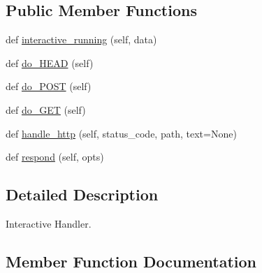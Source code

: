 \subsection*{Public Member Functions}
\begin{DoxyCompactItemize}
\item 
def \hyperlink{classprojects_1_1personality__captions_1_1interactive_1_1MyHandler_ae58a0c4c564f54a29ff85afa26086e47}{interactive\+\_\+running} (self, data)
\item 
def \hyperlink{classprojects_1_1personality__captions_1_1interactive_1_1MyHandler_a51c600da08cf2f01d860f4a4c500e827}{do\+\_\+\+H\+E\+AD} (self)
\item 
def \hyperlink{classprojects_1_1personality__captions_1_1interactive_1_1MyHandler_a846c973c3c91308218b79f84396265ac}{do\+\_\+\+P\+O\+ST} (self)
\item 
def \hyperlink{classprojects_1_1personality__captions_1_1interactive_1_1MyHandler_a52eec9579c85ca0497df9cbe773f729c}{do\+\_\+\+G\+ET} (self)
\item 
def \hyperlink{classprojects_1_1personality__captions_1_1interactive_1_1MyHandler_aa0900ea1f19ecd9cd9bf0ae93ce1028e}{handle\+\_\+http} (self, status\+\_\+code, path, text=None)
\item 
def \hyperlink{classprojects_1_1personality__captions_1_1interactive_1_1MyHandler_a990c770086f0596dde94fc2a84e76d90}{respond} (self, opts)
\end{DoxyCompactItemize}


\subsection{Detailed Description}
\begin{DoxyVerb}Interactive Handler.
\end{DoxyVerb}
 

\subsection{Member Function Documentation}
\mbox{\label{classprojects_1_1personality__captions_1_1interactive_1_1MyHandler_a52eec9579c85ca0497df9cbe773f729c}} 
